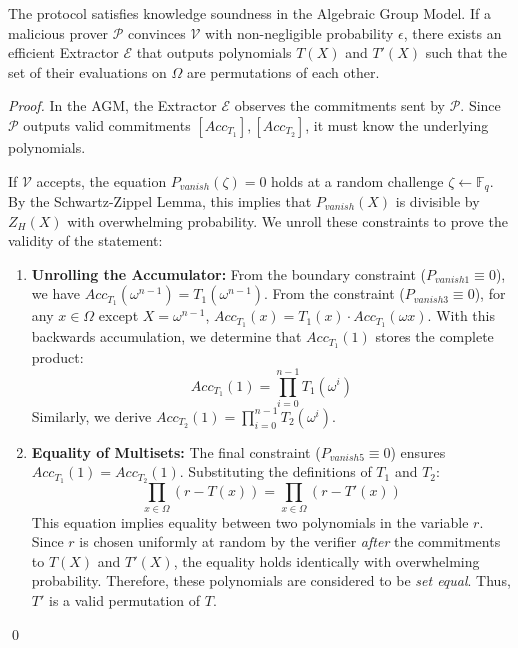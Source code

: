 \begin{theorem}
    The protocol satisfies knowledge soundness in the Algebraic Group Model. If a malicious prover ${\mathcal{P}}$ convinces $\mathcal{V}$ with non-negligible probability $\epsilon$, there exists an efficient Extractor $\mathcal{E}$ that outputs polynomials $T(X)$ and $T'(X)$ such that the set of their evaluations on $\Omega$ are permutations of each other.
\end{theorem}

\begin{proof}
    In the AGM, the Extractor $\mathcal{E}$ observes the commitments sent by ${\mathcal{P}}$. Since ${\mathcal{P}}$ outputs valid commitments $[Acc_{T_1}], [Acc_{T_2}]$, it must know the underlying polynomials.
    
    If $\mathcal{V}$ accepts, the equation $P_{vanish}(\zeta) = 0$ holds at a random challenge $\zeta \leftarrow \mathbb{F}_q$. By the Schwartz-Zippel Lemma, this implies that $P_{vanish}(X)$ is divisible by $Z_H(X)$ with overwhelming probability. 
    We unroll these constraints to prove the validity of the statement:

    \begin{enumerate}
        \item \textbf{Unrolling the Accumulator:}
        From the boundary constraint ($P_{vanish1} \equiv 0$), we have $Acc_{T_1}(\omega^{n-1}) = T_1(\omega^{n-1})$.
        From the constraint ($P_{vanish3} \equiv 0$), for any $x \in \Omega$ except $X= \omega^{n-1}$, $Acc_{T_1}(x) = T_1(x) \cdot Acc_{T_1}(\omega x)$.
        With this backwards accumulation, we determine that $Acc_{T_1}(1)$ stores the complete product:
        \begin{equation}
            Acc_{T_1}(1) = \prod_{i=0}^{n-1} T_1(\omega^i)
        \end{equation}
        Similarly, we derive $Acc_{T_2}(1) = \prod_{i=0}^{n-1} T_2(\omega^i)$.

        \item \textbf{Equality of Multisets:}
        The final constraint ($P_{vanish5} \equiv 0$) ensures $Acc_{T_1}(1) = Acc_{T_2}(1)$. Substituting the definitions of $T_1$ and $T_2$:
        \begin{equation}
            \prod_{x \in \Omega} (r - T(x)) = \prod_{x \in \Omega} (r - T'(x))
        \end{equation}
        This equation implies equality between two polynomials in the variable $r$. Since $r$ is chosen uniformly at random by the verifier \emph{after} the commitments to $T(X)$ and $T'(X)$, the equality holds identically with overwhelming probability. 
        Therefore, these polynomials are considered to be \emph{set equal}. Thus, $T'$ is a valid permutation of $T$.
    \end{enumerate}
    \qed
\end{proof}

